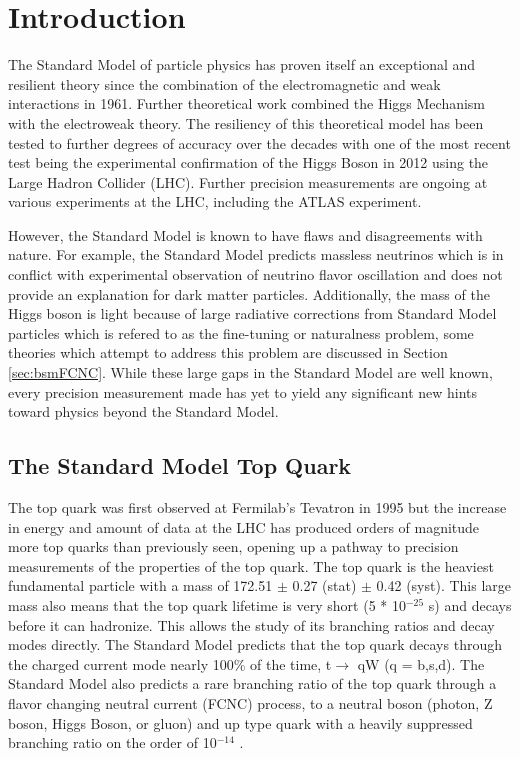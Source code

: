 \chapter{Introduction}
\label{ch:Introduction}



The Standard Model of particle physics has proven itself an exceptional and resilient theory since the combination of the electromagnetic and weak interactions in 1961\cite{SM1Glashow}.  Further theoretical work combined the Higgs Mechanism\cite{Higgs1,Higgs2} with the electroweak theory\cite{SM2Weinberg, SM3Salam}.  The resiliency of this theoretical model has been tested to further degrees of accuracy over the decades with one of the most recent test being the experimental confirmation of the Higgs Boson in 2012\cite{Higgs3,Higgs4} using the Large Hadron Collider (LHC).  Further precision measurements are ongoing at various experiments at the LHC, including the ATLAS experiment.

However, the Standard Model is known to have flaws and disagreements with nature.  For example, the Standard Model predicts massless neutrinos which is in conflict with experimental observation of neutrino flavor oscillation and does not provide an explanation for dark matter particles. Additionally, the mass of the Higgs boson is light because of large radiative corrections from Standard Model particles which is refered to as the fine-tuning or naturalness problem, some theories which attempt to address this problem are discussed in Section \ref{sec:bsmFCNC}.  While these large gaps in the Standard Model are well known, every precision measurement made has yet to yield any significant new hints toward physics beyond the Standard Model.  

\section{The Standard Model Top Quark}
The top quark was first observed at Fermilab's Tevatron in 1995\cite{TopObs} but the increase in energy and amount of data at the LHC has produced orders of magnitude more top quarks than previously seen, opening up a pathway to precision measurements of the properties of the top quark.  The top quark is the heaviest fundamental particle with a mass of 172.51 $\pm$ 0.27 (stat) $\pm$ 0.42 (syst)\cite{TopMass2017}.  This large mass also means that the top quark lifetime is very short (5 * 10$^{-25}$ s) and decays before it can hadronize.  This allows the study of its branching ratios and decay modes directly.  The Standard Model predicts that the top quark decays through the charged current mode nearly 100\% of the time, t$\rightarrow$ qW (q = b,s,d)\cite{PDG2018}.   The Standard Model also predicts a rare branching ratio of the top quark through a flavor changing neutral current (FCNC) process, to a neutral boson (photon, Z boson, Higgs Boson, or gluon) and up type quark with a heavily suppressed branching ratio on the order of 10$^{-14}$ \cite{2HDM-2}.

